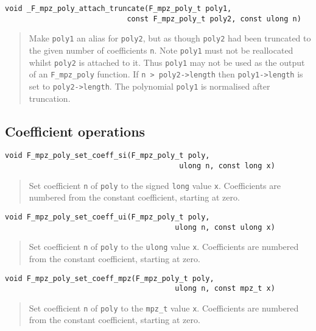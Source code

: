 \documentclass[a4paper,10pt]{article}
\newcommand{\code}{\lstinline}
\begin{document}
\begin{lstlisting}
void _F_mpz_poly_attach_truncate(F_mpz_poly_t poly1, 
                            const F_mpz_poly_t poly2, const ulong n)
\end{lstlisting}
\begin{quote}
Make \code{poly1} an alias for \code{poly2}, but as though \code{poly2} had been truncated to the given 
number of coefficients \code{n}. Note \code{poly1} must not be reallocated whilst \code{poly2} is 
attached to it. Thus \code{poly1} may not be used as the output of an \code{F_mpz_poly} function. If 
\code{n > poly2->length} then \code{poly1->length} is set to \code{poly2->length}. The polynomial 
\code{poly1} is normalised after truncation.
\end{quote}

\subsection{Coefficient operations}

\begin{lstlisting}
void F_mpz_poly_set_coeff_si(F_mpz_poly_t poly, 
                                        ulong n, const long x)
\end{lstlisting}
\begin{quote}
Set coefficient \code{n} of \code{poly} to the signed \code{long} value \code{x}. Coefficients are 
numbered from the constant coefficient, starting at zero.
\end{quote}

\begin{lstlisting}
void F_mpz_poly_set_coeff_ui(F_mpz_poly_t poly, 
                                       ulong n, const ulong x)
\end{lstlisting}
\begin{quote}
Set coefficient \code{n} of \code{poly} to the \code{ulong} value \code{x}. Coefficients are 
numbered from the constant coefficient, starting at zero.
\end{quote}

\begin{lstlisting}
void F_mpz_poly_set_coeff_mpz(F_mpz_poly_t poly, 
                                       ulong n, const mpz_t x)
\end{lstlisting}
\begin{quote}
Set coefficient \code{n} of \code{poly} to the \code{mpz_t} value \code{x}. Coefficients are 
numbered from the constant coefficient, starting at zero.
\end{quote}
\end{document}
